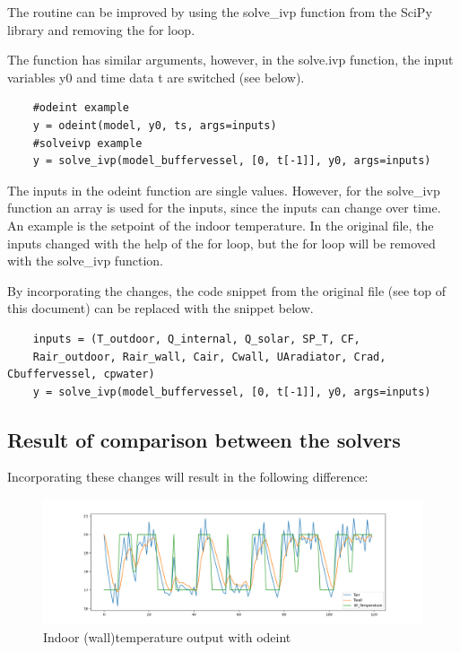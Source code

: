 The routine can be improved by using the \textsf{solve\_ivp} function from the \textsf{SciPy} library and removing the \textsf{for} loop.

The function has similar arguments, however, in the \textsf{solve.ivp} function, the input variables \textsf{y0} and time data \textsf{t} are switched (see below).


\begin{lstlisting}
	#odeint example
	y = odeint(model, y0, ts, args=inputs)
	#solveivp example
	y = solve_ivp(model_buffervessel, [0, t[-1]], y0, args=inputs)
\end{lstlisting}

The inputs in the \textsf{odeint} function are single values. However, for the \textsf{solve\_ivp} function an array is used for the inputs, since the inputs can change over time. An example is the setpoint of the indoor temperature. In the original file, the inputs changed with the help of the for loop, but the for loop will be removed with the \textsf{solve\_ivp} function.

By incorporating the changes, the code snippet from the original file (see top of this document) can be replaced with the snippet below.

\begin{lstlisting}
	inputs = (T_outdoor, Q_internal, Q_solar, SP_T, CF,
	Rair_outdoor, Rair_wall, Cair, Cwall, UAradiator, Crad, Cbuffervessel, cpwater)
	y = solve_ivp(model_buffervessel, [0, t[-1]], y0, args=inputs)
\end{lstlisting}

\subsection{Result of comparison between the solvers}

Incorporating these changes will result in the following difference:

\begin{figure}[ht]
	\centering
	\includegraphics[width=1\columnwidth]{pictures/odeint_with_for_loop.png}
	\caption[Short title]{Indoor (wall)temperature output with \textsf{odeint}}
	\label{fig:profilelabels}
\end{figure}

